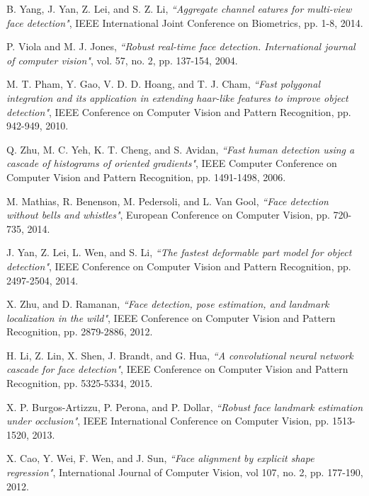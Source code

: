 B. Yang, J. Yan, Z. Lei, and S. Z. Li,
\textit{``Aggregate channel eatures for multi-view face detection"},
IEEE International Joint Conference on Biometrics,
pp. 1-8, 2014.

P. Viola and M. J. Jones,
\textit{``Robust real-time face detection. International journal of computer vision"},
vol. 57, no. 2, pp. 137-154, 2004.

M. T. Pham, Y. Gao, V. D. D. Hoang, and T. J. Cham,
\textit{``Fast polygonal integration and its application in extending haar-like features to improve object detection"},
IEEE Conference on Computer Vision and Pattern Recognition, pp. 942-949, 2010.

Q. Zhu, M. C. Yeh, K. T. Cheng, and S. Avidan,
\textit{``Fast human detection using a cascade of histograms of oriented gradients"},
IEEE Computer Conference on Computer Vision and Pattern Recognition,
pp. 1491-1498, 2006.

M. Mathias, R. Benenson, M. Pedersoli, and L. Van Gool,
\textit{``Face detection without bells and whistles"},
European Conference on Computer Vision,
pp. 720-735, 2014.

J. Yan, Z. Lei, L. Wen, and S. Li,
\textit{``The fastest deformable part model for object detection"},
IEEE Conference on Computer Vision and Pattern Recognition,
pp. 2497-2504, 2014.

X. Zhu, and D. Ramanan,
\textit{``Face detection, pose estimation, and landmark localization in the wild"},
IEEE Conference on Computer Vision and Pattern Recognition,
pp. 2879-2886, 2012.

H. Li, Z. Lin, X. Shen, J. Brandt, and G. Hua,
\textit{``A convolutional neural network cascade for face detection"},
IEEE Conference on Computer Vision and Pattern Recognition,
pp. 5325-5334, 2015. 

X. P. Burgos-Artizzu, P. Perona, and P. Dollar,
\textit{``Robust face landmark estimation under occlusion"},
IEEE International Conference on Computer Vision,
pp. 1513-1520, 2013.

X. Cao, Y. Wei, F. Wen, and J. Sun,
\textit{``Face alignment by explicit shape regression"},
International Journal of Computer Vision,
vol 107, no. 2, pp. 177-190, 2012.

